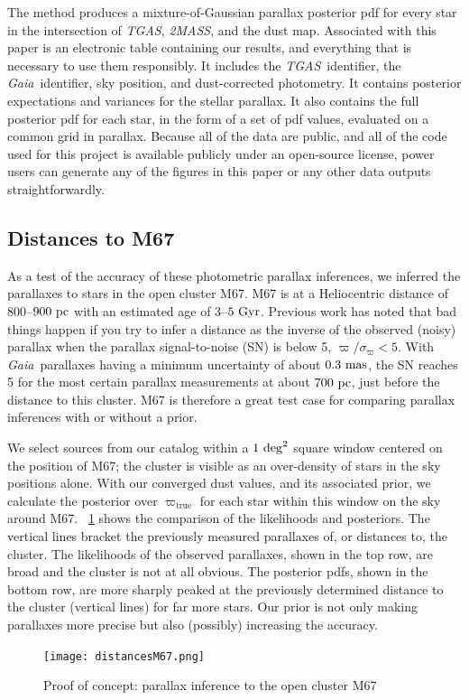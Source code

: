 \documentclass[modern]{aastex61}
\newcommand{\acronym}[1]{{\small{#1}}}
\newcommand{\project}[1]{\textsl{#1}}
\newcommand{\tgas}{\project{\acronym{TGAS}}}
\newcommand{\tmass}{\project{\acronym{2MASS}}}
\newcommand{\gaia}{\project{Gaia}}
\newcommand{\true}{\mathrm{true}}
\begin{document}
The method produces a mixture-of-Gaussian parallax posterior pdf for every
star in the intersection of \tgas, \tmass, and the dust map.
Associated with this paper is an electronic table containing our results, and everything
that is necessary to use them responsibly.
It includes the \tgas\ identifier, the \gaia\ identifier, sky position, and dust-corrected
photometry.
It contains posterior expectations and variances for the stellar parallax.
It also contains the full posterior pdf for each star, in the form of a set of pdf values,
evaluated on a common grid in parallax.
Because all of the data are public, and all of the code used for this project is available
publicly under an open-source license, power users can generate any of the figures in this
paper or any other data outputs straightforwardly.

\subsection{Distances to M67}
As a test of the accuracy of these photometric parallax inferences, we inferred the parallaxes to stars in the open cluster M67.
M67 is at a Heliocentric distance of $800$--$900~{\rm pc}$ with an estimated age of 3--$5~{\rm Gyr}$.
Previous work \citep{cbj15} has noted that bad things happen if you try to infer a distance as the inverse of the observed (noisy) parallax when the parallax signal-to-noise (SN) is below 5, $\varpi / \sigma_\varpi < 5$.
With \gaia\ parallaxes having a minimum uncertainty of about $0.3~{\rm mas}$, the SN reaches 5 for the most certain parallax measurements at about $700~{\rm pc}$, just before the distance to this cluster.
M67 is therefore a great test case for comparing parallax inferences with or without a prior.

We select sources from our catalog within a $1~{\rm deg}^2$ square window centered on the position of M67; the cluster is visible as an over-density of stars in the sky positions alone.
With our converged dust values, and its associated prior, we calculate the posterior over $\varpi_{\true}$ for each star within this window on the sky around M67.
\figurename~\ref{fig:m67} shows the comparison of the likelihoods and posteriors.
The vertical lines bracket the previously measured parallaxes of, or distances to, the cluster.
The likelihoods of the observed parallaxes, shown in the top row, are broad and the cluster is not at all obvious.
The posterior pdfs, shown in the bottom row, are more sharply peaked at the previously determined distance to the cluster (vertical lines) for far more stars.
Our prior is not only making parallaxes more precise but also (possibly) increasing the accuracy.
\begin{figure}
\centering
  \texttt{[image: distancesM67.png]}
\caption{Proof of concept: parallax inference to the open cluster M67}
\label{fig:m67}
\end{figure}
\end{document}
